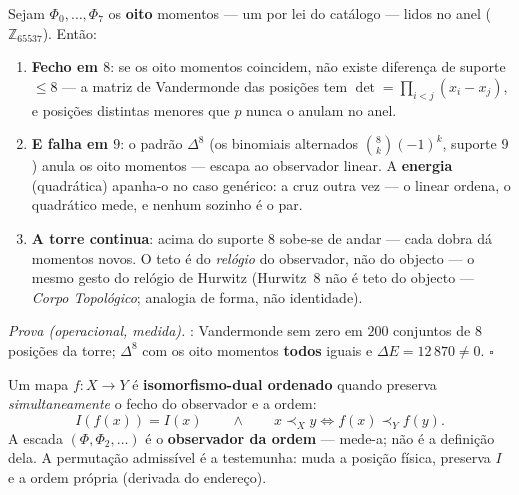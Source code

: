 \documentclass[livro.tex]{subfiles}
\begin{document}
\begin{teorema}\label{thm:teto-oito}
Sejam $\Phi_0,\ldots,\Phi_7$ os \textbf{oito} momentos --- um por lei do
catálogo --- lidos no anel ($\mathbb{Z}_{65537}$). Então:
\begin{enumerate}
\item \textbf{Fecho em $8$}: se os oito momentos coincidem, não existe
diferença de suporte $\le8$ --- a matriz de Vandermonde das posições
tem $\det=\prod_{i<j}(x_i-x_j)$, e posições distintas menores que $p$
nunca o anulam no anel.
\item \textbf{E falha em $9$}: o padrão $\Delta^{8}$ (os binomiais
alternados $\binom{8}{k}(-1)^k$, suporte $9$) anula os oito momentos
--- escapa ao observador linear. A \textbf{energia} (quadrática)
apanha-o no caso genérico: a cruz outra vez --- o linear ordena, o
quadrático mede, e nenhum sozinho é o par.
\item \textbf{A torre continua}: acima do suporte $8$ sobe-se de andar
--- cada dobra dá momentos novos. O teto é do \emph{relógio} do
observador, não do objecto --- o mesmo gesto do relógio de Hurwitz
(Hurwitz~8 não é teto do objecto --- \emph{Corpo Topológico}; analogia de forma, não identidade).
\end{enumerate}
\emph{Prova (operacional, medida).} :
Vandermonde sem zero em $200$ conjuntos de $8$ posições da torre;
$\Delta^{8}$ com os oito momentos \textbf{todos} iguais e
$\Delta E=12\,870\neq0$. $\square$
\end{teorema}

\begin{definicao}\label{def:iso-dual}
Um mapa $f\colon X\to Y$ é \textbf{isomorfismo-dual ordenado} quando
preserva \emph{simultaneamente} o fecho do observador e a ordem:
\[
\boxed{
I(f(x))=I(x)
\qquad\land\qquad
x\prec_X y\iff f(x)\prec_Y f(y).
}
\]
A escada $(\Phi,\Phi_2,\ldots)$ é o \textbf{observador da ordem} ---
mede-a; não é a definição dela. A permutação admissível é a testemunha:
muda a posição física, preserva $I$ e a ordem própria (derivada do
endereço).
\end{definicao}
\end{document}
